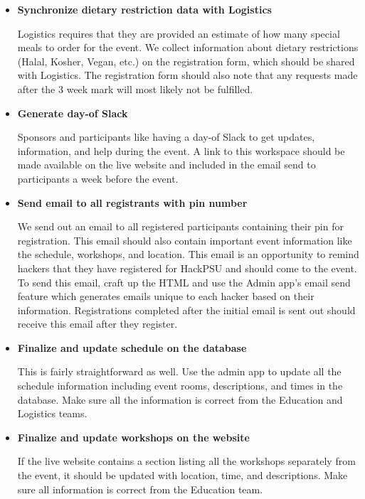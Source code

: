 \documentclass[twoside, 12pt]{article}
\newenvironment{tightitemize} %
{\begin{itemize}\itemsep1pt \parskip0pt \parsep0pt}
{\end{itemize}\vspace{-\topsep}}
\begin{document}
\begin{tightitemize}
    \item \textbf{Synchronize dietary restriction data with Logistics}
    \par Logistics requires that they are provided an estimate of how many special meals to order for the event. We collect information about dietary restrictions (Halal, Kosher, Vegan, etc.) on the registration form, which should be shared with Logistics. The registration form should also note that any requests made after the 3 week mark will most likely not be fulfilled.
    
    \item \textbf{Generate day-of Slack}
    \par Sponsors and participants like having a day-of Slack to get updates, information, and help during the event. A link to this workspace should be made available on the live website and included in the email send to participants a week before the event.
    
    \item \textbf{Send email to all registrants with pin number}
    \par We send out an email to all registered participants containing their pin for registration. This email should also contain important event information like the schedule, workshops, and location. This email is an opportunity to remind hackers that they have registered for HackPSU and should come to the event. To send this email, craft up the HTML and use the Admin app's email send feature which generates emails unique to each hacker based on their information.  Registrations completed after the initial email is sent out should receive this email after they register.
    
    \item \textbf{Finalize and update schedule on the database}
    \par This is fairly straightforward as well. Use the admin app to update all the schedule information including event rooms, descriptions, and times in the database.  Make sure all the information is correct from the Education and Logistics teams.
    
    \item \textbf{Finalize and update workshops on the website}
    \par If the live website contains a section listing all the workshops separately from the event, it should be updated with location, time, and descriptions.  Make sure all information is correct from the Education team.
    

\end{tightitemize}
\end{document}
